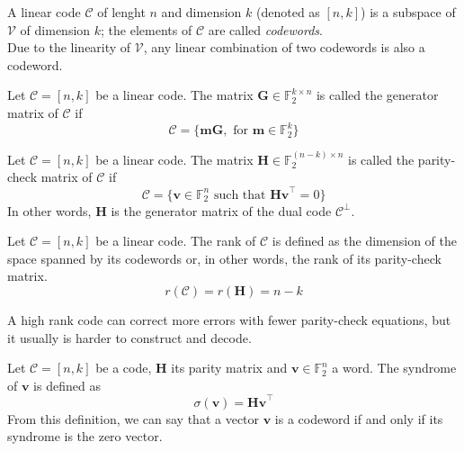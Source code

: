 \begin{definition}
    A linear code $\mathcal{C}$ of lenght $n$ and dimension $k$ (denoted as $[n, k]$) is a subspace of $\mathcal{V}$ 
    of dimension $k$; the elements of $\mathcal{C}$ are called \textit{codewords}.\\
    Due to the linearity of $\mathcal{V}$, any linear combination of two codewords is also a codeword.
\end{definition}

\begin{definition}
    Let $\mathcal{C} = [n,k]$ be a linear code. The matrix $\mathbf{G} \in \mathds{F}_2^{k\times n}$ is called the generator 
    matrix of $\mathcal{C}$ if
    \begin{equation*}
        \mathcal{C} = \{\mathbf{mG}, \text{ for } \mathbf{m}\in \mathds{F}_2^k\}
    \end{equation*}
\end{definition}

\begin{definition}
    Let $\mathcal{C} = [n,k]$ be a linear code. The matrix $\mathbf{H} \in \mathds{F}_2^{(n-k)\times n}$ is called the 
    parity-check matrix of $\mathcal{C}$ if
    \begin{equation*}
        \mathcal{C} = \{\mathbf{v} \in \mathds{F}_2^n \text{ such that } \mathbf{Hv}^\top = 0\}
    \end{equation*}
    In other words, $\mathbf{H}$ is the generator matrix of the dual code $\mathcal{C}^\perp$.
\end{definition}

\begin{definition}[Rank]
    Let $\mathcal{C} = [n,k]$ be a linear code. The rank of $\mathcal{C}$ is defined as the dimension of the space spanned
    by its codewords or, in other words, the rank of its parity-check matrix.
    \begin{equation*}
        r(\mathcal{C}) = r(\mathbf{H}) = n-k
    \end{equation*}
\end{definition}
A high rank code can correct more errors with fewer parity-check equations, but it usually is harder to construct and decode.

\begin{definition}[Syndrome]
    Let $\mathcal{C} = [n,k]$ be a code, $\mathbf{H}$ its parity matrix and $\mathbf{v} \in \mathds{F}_2^n$ a word. 
    The syndrome of $\mathbf{v}$ is defined as
    \begin{equation*}
        \sigma(\mathbf{v}) = \mathbf{Hv}^\top
    \end{equation*}
    From this definition, we can say that a vector $\mathbf{v}$ is a codeword if and only if its syndrome is the zero vector.
\end{definition}

